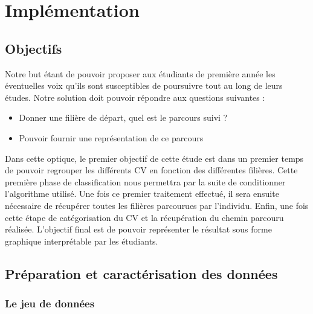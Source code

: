 \documentclass[memoire.tex]{subfiles}
\begin{document}
\chapter{Implémentation}

\section{Objectifs}

Notre but étant de pouvoir proposer aux étudiants de première année les éventuelles voix qu'ils sont susceptibles de poursuivre tout au long de leurs études. Notre solution doit pouvoir répondre aux questions suivantes : \begin{itemize}
\item Donner une filière de départ, quel est le parcours suivi ?
\item Pouvoir fournir une représentation de ce parcours
\end{itemize}
Dans cette optique, le premier objectif de cette étude est dans un premier temps de pouvoir regrouper les différents CV en fonction des différentes filières. Cette première phase de classification nous permettra par la suite de conditionner l'algorithme utilisé. Une fois ce premier traitement effectué, il sera ensuite nécessaire de récupérer toutes les filières parcourues par l'individu. Enfin, une fois cette étape de catégorisation du CV et la récupération du chemin parcouru réalisée. L'objectif final est de pouvoir représenter le résultat sous forme graphique interprétable par les étudiants.

\section{Préparation et caractérisation des données}

\subsection{Le jeu de données}
\end{document}

